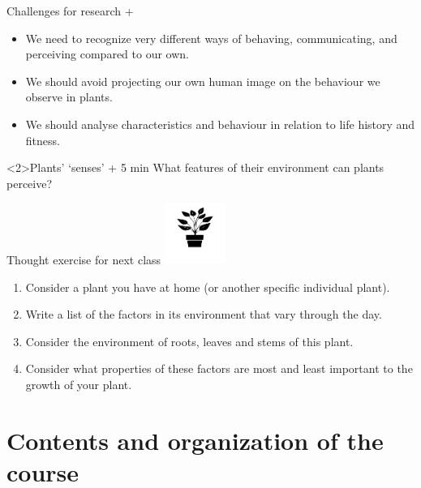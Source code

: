 \documentclass[10pt]{beamer}
\begin{document}
\begin{frame}{Challenges for research + \Discussion}

\begin{itemize}
    \item<1-2> We need to recognize very different ways of behaving, communicating, and perceiving compared to our own.
    \item<1-2> We should avoid projecting our own human image on the behaviour we observe in plants.
    \item<1-2> We should analyse characteristics and behaviour in relation to life history and fitness.
\end{itemize}

\begin{alertblock}<2>{Plants' `senses'  + 5 min}
  \vspace{0.5ex}
  What features of their environment can plants perceive?\\
\end{alertblock}

\end{frame}

\begin{frame}{\HomeWork Thought exercise for next class}
\includegraphics[width=2cm]{figures/icons-svg/noun-plant-1358991.png}
\begin{enumerate}
  \item Consider a plant you have at home (or another specific individual plant).
  \item Write a list of the factors in its environment that vary through the day.
  \item Consider the environment of roots, leaves and stems of this plant.
  \item Consider what properties of these factors are most and least important to the growth of your plant.
\end{enumerate}
\end{frame}

\section{Contents and organization of the course}
\end{document}
